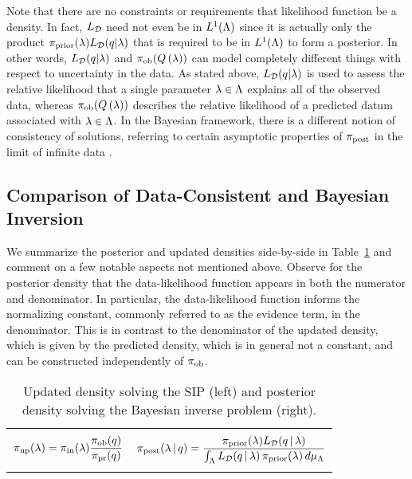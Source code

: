 Note that there are no constraints or requirements that likelihood function be a density.
In fact, $L_{\mathcal{D}}$ need not even be in $L^1({\Lambda})$ since it is actually only the product $\operatorname*{\pi_{prior}}(\lambda) L_{\mathcal{D}} (q | \lambda)$ that is required to be in $L^1({\Lambda})$ to form a posterior.
In other words, $L_{\mathcal{D}} (q | \lambda)$ and $\operatorname*{\pi_{ob}}(Q\left ( \lambda \right ))$ can model completely different things with respect to uncertainty in the data.
As stated above, $L_{\mathcal{D}} (q | \lambda)$ is used to assess the relative likelihood that a single parameter $\lambda\in{\Lambda}$ explains all of the observed data, whereas $\operatorname*{\pi_{ob}}(Q\left ( \lambda \right ))$ describes the relative likelihood of a predicted datum associated with $\lambda\in{\Lambda}$.
In the Bayesian framework, there is a different notion of consistency of solutions, referring to certain asymptotic properties of $\operatorname*{\pi_{post}}$ in the limit of infinite data \citep{Barron, Silverman, starktenorio}.




\subsection{Comparison of Data-Consistent and Bayesian Inversion}\label{sec:bayesian}

We summarize the posterior and updated densities side-by-side in Table~\ref{tab:dens_comparisons} and comment on a few notable aspects not mentioned above.
Observe for the posterior density that the data-likelihood function appears in both the numerator and denominator.
In particular, the data-likelihood function informs the {normalizing constant}, commonly referred to as the evidence term, in the denominator.
This is in contrast to the denominator of the updated density, which is given by the predicted density, which is in general not a constant, and can be constructed independently of $\operatorname*{\pi_{ob}}$.

\begin{table}[htbp]
\centering
\begin{tabular}{|c|c|}
\hline
 & \\
$\displaystyle \operatorname*{\pi_{up}}(\lambda) = \operatorname*{\pi_{in}}(\lambda) \frac{\operatorname*{\pi_{ob}}(q)}{\operatorname*{\pi_{pr}}(q)}
$
&
$
	\displaystyle \pi_{\text{post}}(\lambda\,|\,q) = \frac{\operatorname*{\pi_{prior}}(\lambda)L_{\mathcal{D}}(q \,|\,\lambda)}{\int_{\Lambda} L_{\mathcal{D}}(q \, |\, \lambda)  \operatorname*{\pi_{prior}}(\lambda) \, d\mu_{{\Lambda}}}
$
 \\ & \\ \hline
\end{tabular}
\caption{Updated density solving the SIP (left) and posterior density solving the Bayesian inverse problem (right).}
		\label{tab:dens_comparisons}
\end{table}

